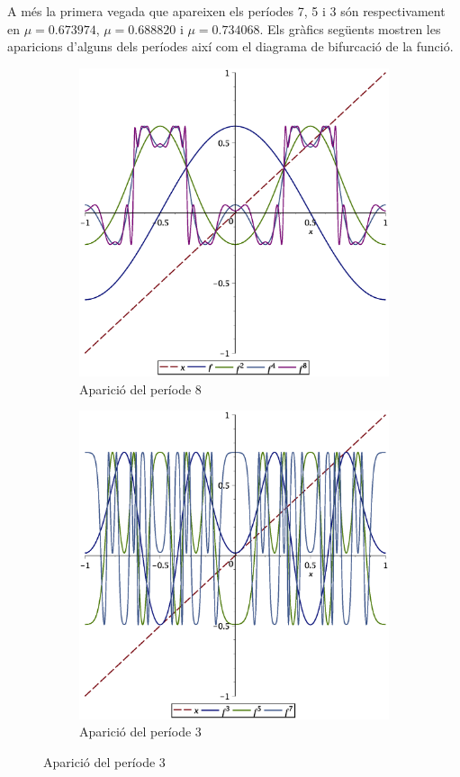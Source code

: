 \documentclass[a4paper]{article}
\theoremstyle{definition}
\begin{document}
A més la primera vegada que apareixen els períodes 7, 5 i 3 són respectivament en $\mu = 0.673974$, $\mu= 0.688820$ i $\mu = 0.734068$.
Els gràfics següents mostren les aparicions d'alguns dels períodes així com el diagrama de bifurcació de la funció.
\begin{figure}[ht]
  \begin{subfigure}[ht]{0.45\linewidth}
    \centering
    \includegraphics[width=\linewidth]{Images/map42.eps}
    \caption{Aparició del període 8}
  \end{subfigure}
  \hfill
  \begin{subfigure}[ht]{0.45\linewidth}
    \centering
    \includegraphics[width=\linewidth]{Images/map45.eps}
    \caption{Aparició del període 3}
  \end{subfigure}
\end{figure}
\end{document}
